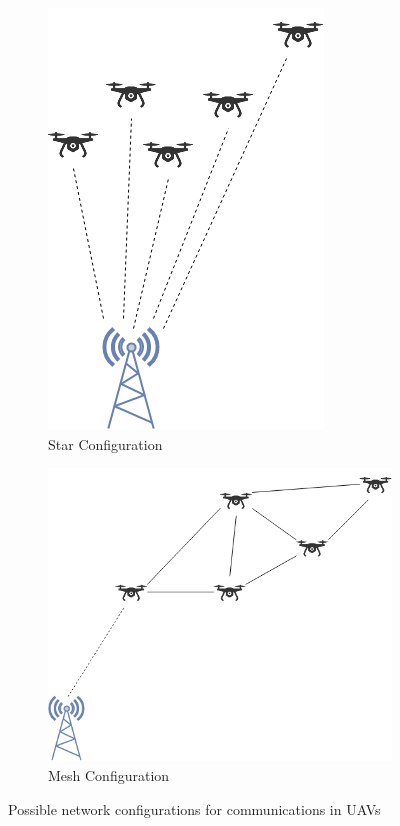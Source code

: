 \begin{figure}
	\centering
	\begin{subfigure}[b]{0.3\textwidth}
		\centering
		\includegraphics[scale=0.45]{Pictures/star.png}
		\caption{Star Configuration}
		\label{fig: starconf}
	\end{subfigure}
	\begin{subfigure}[b]{0.3\textwidth}
		\centering
		\includegraphics[scale=0.45]{Pictures/mesh.png}
		\caption{Mesh Configuration}
		\label{fig: meshconf}
	\end{subfigure}
	\caption{Possible network configurations for communications in UAVs}
	\label{fig: netconf}
\end{figure}

